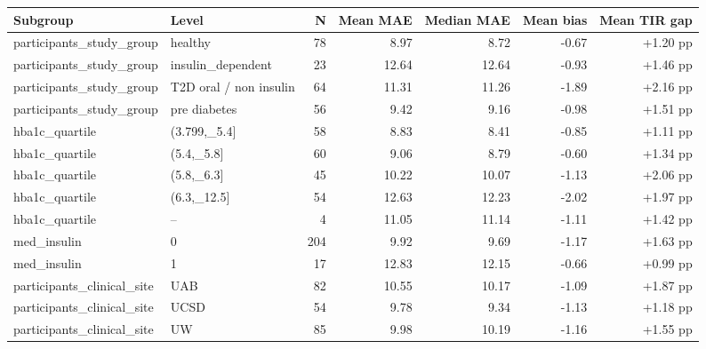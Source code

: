 \begin{tabular}{llrrrrr}
\toprule
Subgroup & Level & N & Mean MAE & Median MAE & Mean bias & Mean TIR gap \\
\midrule
participants\_study\_group & healthy & 78 & 8.97 & 8.72 & -0.67 & +1.20 pp \\
participants\_study\_group & insulin\_dependent & 23 & 12.64 & 12.64 & -0.93 & +1.46 pp \\
participants\_study\_group & T2D oral / non insulin & 64 & 11.31 & 11.26 & -1.89 & +2.16 pp \\
participants\_study\_group & pre diabetes& 56 & 9.42 & 9.16 & -0.98 & +1.51 pp \\
hba1c\_quartile & (3.799,\_5.4] & 58 & 8.83 & 8.41 & -0.85 & +1.11 pp \\
hba1c\_quartile & (5.4,\_5.8] & 60 & 9.06 & 8.79 & -0.60 & +1.34 pp \\
hba1c\_quartile & (5.8,\_6.3] & 45 & 10.22 & 10.07 & -1.13 & +2.06 pp \\
hba1c\_quartile & (6.3,\_12.5] & 54 & 12.63 & 12.23 & -2.02 & +1.97 pp \\
hba1c\_quartile & -- & 4 & 11.05 & 11.14 & -1.11 & +1.42 pp \\
med\_insulin & 0 & 204 & 9.92 & 9.69 & -1.17 & +1.63 pp \\
med\_insulin & 1 & 17 & 12.83 & 12.15 & -0.66 & +0.99 pp \\
participants\_clinical\_site & UAB & 82 & 10.55 & 10.17 & -1.09 & +1.87 pp \\
participants\_clinical\_site & UCSD & 54 & 9.78 & 9.34 & -1.13 & +1.18 pp \\
participants\_clinical\_site & UW & 85 & 9.98 & 10.19 & -1.16 & +1.55 pp \\
\bottomrule
\end{tabular}
